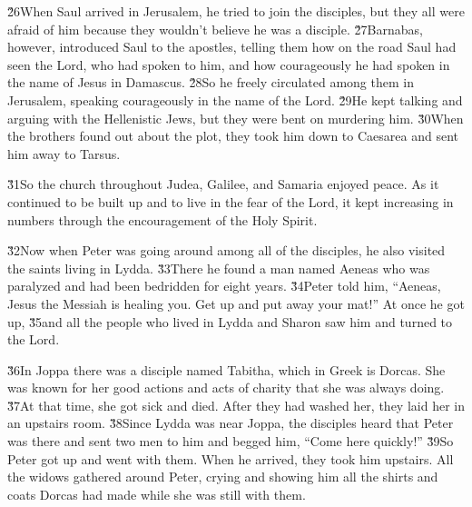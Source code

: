 \v{26}When Saul arrived in Jerusalem, he tried to join the disciples, but they all were afraid of him because they wouldn't believe he was a disciple. \v{27}Barnabas, however, introduced Saul to the apostles, telling them how on the road Saul had seen the Lord, who had spoken to him, and how courageously he had spoken in the name of Jesus in Damascus. \v{28}So he freely circulated among them in Jerusalem, speaking courageously in the name of the Lord. \v{29}He kept talking and arguing with the Hellenistic Jews, but they were bent on murdering him. \v{30}When the brothers found out about the plot, they took him down to Caesarea and sent him away to Tarsus.

\v{31}So the church throughout Judea, Galilee, and Samaria enjoyed peace. As it continued to be built up and to live in the fear of the Lord, it kept increasing in numbers through the encouragement of the Holy Spirit.

\v{32}Now when Peter was going around among all of the disciples, he also visited the saints living in Lydda. \v{33}There he found a man named Aeneas who was paralyzed and had been bedridden for eight years. \v{34}Peter told him, ``Aeneas, Jesus the Messiah is healing you. Get up and put away your mat!'' At once he got up, \v{35}and all the people who lived in Lydda and Sharon saw him and turned to the Lord.

\v{36}In Joppa there was a disciple named Tabitha, which in Greek is Dorcas. She was known for her good actions and acts of charity that she was always doing. \v{37}At that time, she got sick and died. After they had washed her, they laid her in an upstairs room. \v{38}Since Lydda was near Joppa, the disciples heard that Peter was there and sent two men to him and begged him, ``Come here quickly!'' \v{39}So Peter got up and went with them. When he arrived, they took him upstairs. All the widows gathered around Peter, crying and showing him all the shirts and coats Dorcas had made while she was still with them.

